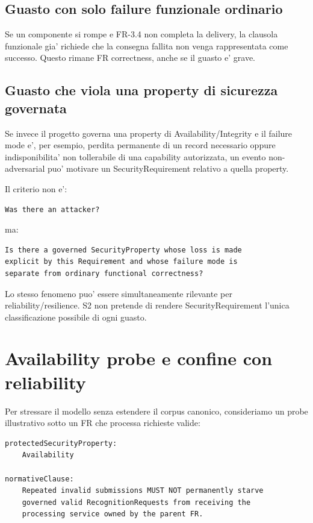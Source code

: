 \documentclass[11pt,a4paper]{article}
\begin{document}
\subsection{Guasto con solo failure funzionale ordinario}

Se un componente si rompe e FR-3.4 non completa la delivery, la clausola funzionale gia' richiede che la consegna fallita non venga rappresentata come successo. Questo rimane FR correctness, anche se il guasto e' grave.

\subsection{Guasto che viola una property di sicurezza governata}

Se invece il progetto governa una property di Availability/Integrity e il failure mode e', per esempio, perdita permanente di un record necessario oppure indisponibilita' non tollerabile di una capability autorizzata, un evento non-adversarial puo' motivare un SecurityRequirement relativo a quella property.

Il criterio non e':

\begin{lstlisting}
Was there an attacker?
\end{lstlisting}

ma:

\begin{lstlisting}
Is there a governed SecurityProperty whose loss is made
explicit by this Requirement and whose failure mode is
separate from ordinary functional correctness?
\end{lstlisting}

Lo stesso fenomeno puo' essere simultaneamente rilevante per reliability/resilience. S2 non pretende di rendere SecurityRequirement l'unica classificazione possibile di ogni guasto.

\section{Availability probe e confine con reliability}

Per stressare il modello senza estendere il corpus canonico, consideriamo un probe illustrativo sotto un FR che processa richieste valide:

\begin{lstlisting}
protectedSecurityProperty:
    Availability

normativeClause:
    Repeated invalid submissions MUST NOT permanently starve
    governed valid RecognitionRequests from receiving the
    processing service owned by the parent FR.
\end{lstlisting}
\end{document}
